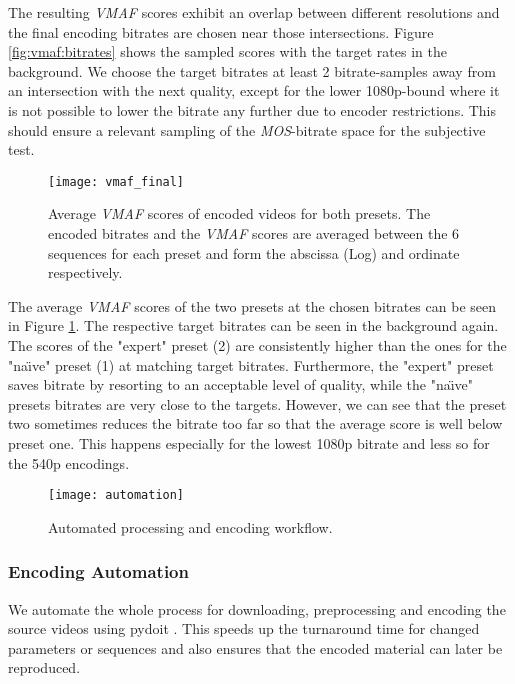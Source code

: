 The resulting \textit{VMAF} scores exhibit an overlap between different resolutions and the final encoding bitrates are chosen near those intersections. Figure \ref{fig:vmaf:bitrates} shows the sampled scores with the target rates in the background. We choose the target bitrates at least 2 bitrate-samples away from an intersection with the next quality, except for the lower 1080p-bound where it is not possible to lower the bitrate any further due to encoder restrictions. This should ensure a relevant sampling of the \textit{MOS}-bitrate space for the subjective test.

\begin{figure}[thb!]
	\centering
	\texttt{[image: vmaf\_final]}
	\caption{Average \textit{VMAF} scores of encoded videos for both presets. The encoded bitrates and the \textit{VMAF} scores are averaged between the 6 sequences for each preset and form the abscissa (Log) and ordinate respectively.}
	\label{fig:vmaf:encoded}
\end{figure}

The average \textit{VMAF} scores of the two presets at the chosen bitrates can be seen in Figure \ref{fig:vmaf:encoded}. The respective target bitrates can be seen in the background again. The scores of the "expert" preset (2) are consistently higher than the ones for the "na\"{\i}ve" preset (1) at matching target bitrates. Furthermore, the "expert" preset saves bitrate by resorting to an acceptable level of quality, while the "na\"{\i}ve" presets bitrates are very close to the targets. However, we can see that the preset two sometimes reduces the bitrate too far so that the average score is well below preset one. This happens especially for the lowest 1080p bitrate and less so for the 540p encodings.


\begin{figure}[bht!]
	\centering
	\texttt{[image: automation]}
	\caption{Automated processing and encoding workflow.}
	\label{fig:automation}
\end{figure}

\subsubsection{Encoding Automation}
We automate the whole process for downloading, preprocessing and encoding the source videos using pydoit \cite{web:pydoit}. This speeds up the turnaround time for changed parameters or sequences and also ensures that the encoded material can later be reproduced.

